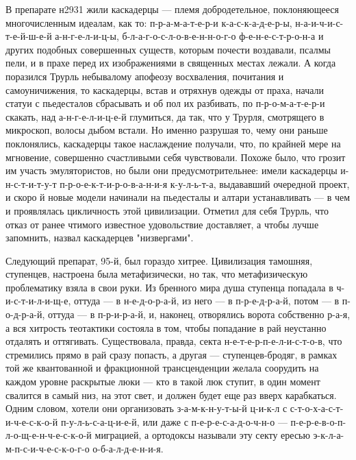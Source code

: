 В препарате н2931 жили каскадерцы --- племя добродетельное,
поклоняющееся многочисленным идеалам, как то:
п-р-а-м-а-т-е-р-и к-а-с-к-а-д-е-р-ы, н-а-и-ч-и-с-т-е-й-ш-е-й
а-н-г-е-л-и-ц-ы, б-л-а-г-о-с-л-о-в-е-н-н-о-г-о
ф-е-н-е-с-т-р-о-н-а и других подобных совершенных существ,
которым почести воздавали, псалмы пели, и в прахе перед их
изображениями в священных местах лежали. А когда поразился
Трурль небывалому апофеозу восхваления, почитания и
самоуничижения, то каскадерцы, встав и отряхнув одежды от
праха, начали статуи с пьедесталов сбрасывать и об пол их
разбивать, по п-р-о-м-а-т-е-р-и скакать, над
а-н-г-е-л-и-ц-е-й глумиться, да так, что у Трурля,
смотрящего в микроскоп, волосы дыбом встали. Но именно
разрушая то, чему они раньше поклонялись, каскадерцы такое
наслаждение получали, что, по крайней мере на мгновение,
совершенно счастливыми себя чувствовали. Похоже было, что
грозит им участь эмулятористов, но были они
предусмотрительнее: имели каскадерцы и-н-с-т-и-т-у-т
п-р-о-е-к-т-и-р-о-в-а-н-и-я к-у-л-ь-т-а, выдававший
очередной проект, и скоро й новые модели начинали на
пьедесталы и алтари устанавливать --- в чем и проявлялась
цикличность этой цивилизации. Отметил для себя Трурль, что
отказ от ранее чтимого известное удовольствие доставляет, а
чтобы лучше запомнить, назвал каскадерцев "низвергами".

Следующий препарат, 95-й, был гораздо хитрее. Цивилизация
тамошняя, ступенцев, настроена была метафизически, но так,
что метафизическую проблематику взяла в свои руки. Из
бренного мира душа ступенца попадала в ч-и-с-т-и-л-и-щ-е,
оттуда --- в н-е-д-о-р-а-й, из него --- в п-р-е-д-р-а-й, потом --- в
п-о-д-р-а-й, оттуда --- в п-р-и-р-а-й, и, наконец,
отворялись ворота собственно р-а-я, а вся хитрость
теотактики состояла в том, чтобы попадание в рай неустанно
отдалять и оттягивать. Существовала, правда, секта
н-е-т-е-р-п-е-л-и-с-т-о-в, что стремились прямо в рай сразу
попасть, а другая --- ступенцев-бродяг, в рамках той же
квантованной и фракционной трансценденции желала соорудить
на каждом уровне раскрытые люки --- кто в такой люк ступит, в
один момент свалится в самый низ, на этот свет, и должен
будет еще раз вверх карабкаться. Одним словом, хотели они
организовать з-а-м-к-н-у-т-ы-й ц-и-к-л с
с-т-о-х-а-с-т-и-ч-е-с-к-о-й п-у-л-ь-с-а-ц-и-е-й, или даже с
п-е-р-е-с-а-д-о-ч-н-о --- п-е-р-е-в-о-п-л-о-щ-е-н-ч-е-с-к-о-й
миграцией, а ортодоксы называли эту секту ересью
э-к-л-а-м-п-с-и-ч-е-с-к-о-г-о о-б-а-л-д-е-н-и-я.

